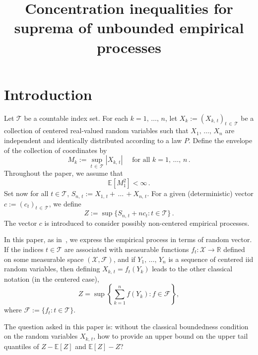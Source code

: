 \documentclass[AHL,Unicode,longabstracts,published]{cedram}
\title[Concentration inequalities for suprema of unbounded empirical processes]{Concentration inequalities for suprema of unbounded empirical processes}
\author[\initial{A.} \lastname{Marchina}]{\firstname{Antoine} \lastname{Marchina}}
\newcommand{\bE}{\mathbb{E}}
\newcommand{\bR}{\mathbb{R}}
\newcommand{\cF}{\mathcal{F}}
\newcommand{\cT}{\mathcal{T}}
\newcommand{\cX}{\mathcal{X}}
\newcommand{\caF}{\mathscr{F}}
\begin{document}
\maketitle

\section{Introduction}
Let $\cT$ be a countable index set. For each $k=1,\,\ldots,\,n$, let $X_k:=(X_{k,\,t})_{t\,\in\,\cT}$ be a collection of centered real-valued random variables such that $X_1,\,\ldots,\,X_n$ are independent and identically distributed according to a law $P$. Define the envelope of the collection of coordinates by
\begin{equation}\label{eqn:def envelope}
M_k:=\sup_{t\,\in\,\cT} \left|X_{k,\,t}\right|\quad\text{ for all }k=1,\,\ldots,\,n\,.
\end{equation}
Throughout the paper, we assume that
\begin{equation}
\bE\left[M_1^2\right]<\infty\,.
\end{equation}
Set now for all $t\in\cT$, $S_{n,\,t}:=X_{1,\,t}+\,\ldots\,+X_{n,\,t}$. For a given (deterministic) vector $c:=(c_t)_{t\,\in\,\cT}$, we define
\begin{equation}\label{eqn:def Z}
Z:=\sup\{S_{n,\,t}+nc_t:t\in\cT\}\,.
\end{equation}
The vector $c$ is introduced to consider possibly non-centered empirical processes.


\begin{rema}
In this paper, as in~\cite{BLM13, vdGL14}, we express the empirical process in terms of random vector. If the indices $t\in\cT$ are associated with measurable functions $f_t:\cX\to\bR$ defined on some measurable space $(\cX,\cF)$, and if $Y_1,\,\ldots,\,Y_n$ is a sequence of centered iid random variables, then defining $X_{k,\,t}=f_t(Y_k)$ leads to the other classical notation (in the centered case),
\[
Z=\sup\left\{\sum_{k=1}^nf(Y_k) : f\in\caF\right\},
\]
where $\caF:=\{f_t:t\in\cT\}$.
\end{rema}

The question asked in this paper is: without the classical boundedness condition on the random variables $X_{k,\,t}$, how to provide an upper bound on the upper tail quantiles of $Z-\bE[Z]$ and $\bE[Z]-Z$?
\end{document}
